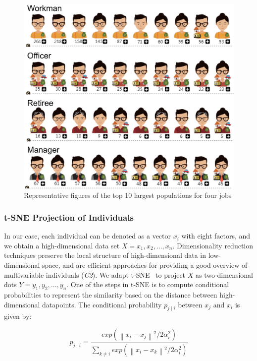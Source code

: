 \documentclass{ieeeaccess}
\begin{document}
\begin{figure}[htb!]
 \centering %
 \includegraphics[width=\columnwidth]{pictures/design_example}
 \caption{Representative figures of the top 10 largest populations for four jobs}
 \label{fig:div_example}
\end{figure}

\subsubsection{t-SNE Projection of Individuals}

In our case, each individual can be denoted as a vector $x_i$ with eight factors, and we obtain a high-dimensional data set $X={x_1, x_2, ..., x_n}$. Dimensionality reduction techniques preserve the local structure of high-dimensional data in low-dimensional space, and are efficient approaches for providing a good overview of multivariable individuals (\textit{C2}). We adapt t-SNE~\cite{maaten2008visualizing} to project $X$ as two-dimensional dots $Y={y_1, y_2, ..., y_n}$. One of the steps in t-SNE is to compute conditional probabilities to represent the similarity based on the distance between high-dimensional datapoints. The conditional probability $p_{j\mid i}$ between $x_j$ and $x_i$ is given by:

\begin{equation}
p_{j\mid i} = \frac{exp({\left \| x_i - x_j \right \|}^2/2\alpha_i ^{2})}{\sum _{k\neq i}exp({\left \| x_i - x_k \right \|}^2/2\alpha_i ^{2})}
\end{equation}
\end{document}
